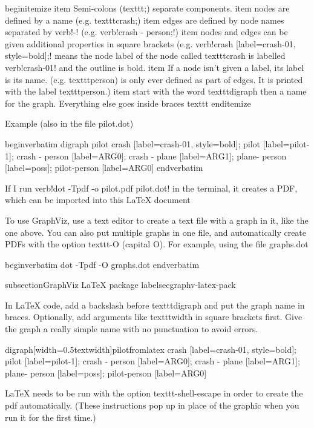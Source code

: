 begin{itemize}
item Semi-colons (texttt{;}) separate components.
item nodes are defined by a name (e.g. texttt{crash;})
item edges are defined by node names separated by verb!-! (e.g. verb!crash - person;!)
item nodes and edges can be given additional properties in square brackets (e.g. verb!crash [label=crash-01, style=bold];! means the node label of the node called texttt{crash} is labelled verb!crash-01! and the outline is bold.
item If a node isn't given a label, its label is its name. (e.g. texttt{person}) is only ever defined as part of edges. It is printed with the label texttt{person}.)
item start with the word texttt{digraph} then a name for the graph. Everything else goes inside braces texttt{{}}
end{itemize}

Example (also in the file pilot.dot)

begin{verbatim}
digraph pilot {
    crash [label=crash-01, style=bold];
    pilot [label=pilot-1];
    crash - person [label=ARG0];
    crash - plane [label=ARG1];
    plane- person [label=poss];
    pilot-person [label=ARG0]
    }
end{verbatim}

If I run verb!dot -Tpdf -o pilot.pdf pilot.dot! in the terminal, it creates a PDF, which can be imported into this LaTeX{} document


To use GraphViz, use a text editor to create a text file with a graph in it, like the one above. You can also put multiple graphs in one file, and automatically create PDFs with the option texttt{-O} (capital O). For example, using the file graphs.dot

begin{verbatim}
dot -Tpdf -O graphs.dot
end{verbatim}



subsection{GraphViz LaTeX{} package}
label{secgraphv-latex-pack}

In LaTeX{} code, add a backslash before texttt{digraph} and put the graph name in braces. Optionally, add arguments like texttt{width} in square brackets first. Give the graph a really simple name with no punctuation to avoid errors.


digraph[width=0.5textwidth]{pilotfromlatex} {
    crash [label=crash-01, style=bold];
    pilot [label=pilot-1];
    crash - person [label=ARG0];
    crash - plane [label=ARG1];
    plane- person [label=poss];
    pilot-person [label=ARG0]
    }


LaTeX{} needs to be run with the option texttt{-shell-escape} in order to create the pdf automatically. (These instructions pop up in place of the graphic when you run it for the first time.)

